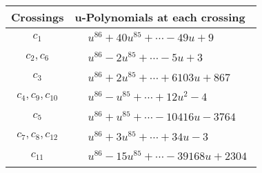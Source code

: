 \documentclass[1p]{elsarticle_modified}
\theoremstyle{definition}
\begin{document}
\begin{tabular}{m{50pt}|m{274pt}}
Crossings & \hspace{64pt}u-Polynomials at each crossing \\
\hline $$\begin{aligned}c_{1}\end{aligned}$$&$\begin{aligned}
&u^{86}+40 u^{85}+\cdots-49 u+9
\end{aligned}$\\
\hline $$\begin{aligned}c_{2},c_{6}\end{aligned}$$&$\begin{aligned}
&u^{86}-2 u^{85}+\cdots-5 u+3
\end{aligned}$\\
\hline $$\begin{aligned}c_{3}\end{aligned}$$&$\begin{aligned}
&u^{86}+2 u^{85}+\cdots+6103 u+867
\end{aligned}$\\
\hline $$\begin{aligned}c_{4},c_{9},c_{10}\end{aligned}$$&$\begin{aligned}
&u^{86}- u^{85}+\cdots+12 u^2-4
\end{aligned}$\\
\hline $$\begin{aligned}c_{5}\end{aligned}$$&$\begin{aligned}
&u^{86}+u^{85}+\cdots-10416 u-3764
\end{aligned}$\\
\hline $$\begin{aligned}c_{7},c_{8},c_{12}\end{aligned}$$&$\begin{aligned}
&u^{86}+3 u^{85}+\cdots+34 u-3
\end{aligned}$\\
\hline $$\begin{aligned}c_{11}\end{aligned}$$&$\begin{aligned}
&u^{86}-15 u^{85}+\cdots-39168 u+2304
\end{aligned}$\\
\hline
\end{tabular}\\~\\
\newpage\renewcommand{\arraystretch}{1}
\end{document}
